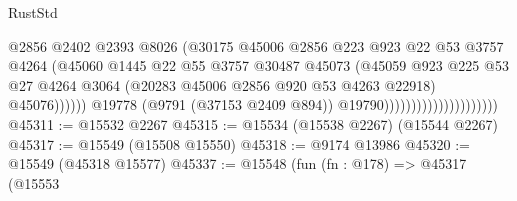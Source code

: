 \begin{lexlean}{RustStd}
\begin{coremodule}
                                                    @2856
                                                    @2402
                                                    @2393
                                                    @8026
                                                    (@30175
                                                      @45006
                                                      @2856
                                                      @223
                                                      @923
                                                      @22
                                                      @53
                                                      @3757
                                                      @4264
                                                      (@45060
                                                        @1445
                                                        @22
                                                        @55
                                                        @3757
                                                        @30487
                                                        @45073
                                                        (@45059
                                                          @923
                                                          @225
                                                          @53
                                                          @27
                                                          @4264
                                                          @3064
                                                          (@20283
                                                            @45006
                                                            @2856
                                                            @920
                                                            @53
                                                            @4263
                                                            @22918)
                                                          @45076))))))
                                              @19778
                                              (@9791 (@37153 @2409 @894))
                                              @19790)))))))))))))))))))))
@45311 := @15532 @2267
@45315 := @15534 (@15538 @2267) (@15544 @2267)
@45317 := @15549 (@15508 @15550)
@45318 := @9174 @13986
@45320 := @15549 (@45318 @15577)
@45337 := @15548
    (fun (fn : @178) =>
    @45317
      (@15553

\end{coremodule}
\end{lexlean}
